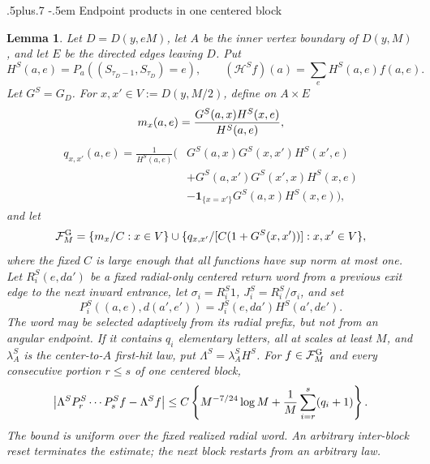 \documentclass[12pt,reqno]{amsart}
\makeatletter
\def\subsection{\@startsection{subsection}{2}{0pt}%
  {.5\linespacing plus.7\linespacing}
  {-.5em}
  {\normalfont\scshape}}
\theoremstyle{plain}
\newtheorem{lemma}[theorem]{Lemma}
\theoremstyle{definition}
\theoremstyle{remark}
\numberwithin{equation}{section}
\makeatother
\begin{document}
\subsection{Endpoint products in one centered block}
\begin{lemma}\label{lem:typed-centered-endpoint-product}
Let \(D=D(y,eM)\), let \(A\) be the inner vertex boundary of
\(D(y,M)\), and let \(E\) be the directed edges leaving \(D\).  Put
\[
 H^S(a,e)=P_a((S_{\tau_D-1},S_{\tau_D})=e),\qquad
 (\mathcal{H}^Sf)(a)=\sum_eH^S(a,e)f(a,e).
\]
Let \(G^S=G_D\).  For \(x,x'\in V:=D(y,M/2)\), define on
\(A\times E\)
\[
 m_x(a,e)={G^S(a,x)H^S(x,e)\over H^S(a,e)},
\]
\[
\begin{aligned}
q_{x,x'}(a,e)=\frac{1}{H^S(a,e)}\big(&G^S(a,x)G^S(x,x')H^S(x',e)\\
  &+G^S(a,x')G^S(x',x)H^S(x,e)\\
  &-\mathbf1_{\{x=x'\}}G^S(a,x)H^S(x,e)\big),
\end{aligned}
\]
and let
\begin{equation}
 \mathcal{F}_M^{\rm G}=\{m_x/C:x\in V\}\cup
 \{q_{x,x'}/[C(1+G^S(x,x'))]:x,x'\in V\},               \label{eq:tu-TP0}
\end{equation}
where the fixed \(C\) is large enough that all functions have sup norm
at most one.
Let \(R_i^S(e,da')\) be a fixed radial-only centered return word from a
previous exit edge to the next inward entrance, let
\(\sigma_i=R_i^S1\), \(J_i^S=R_i^S/\sigma_i\), and set
\begin{equation}
 P_i^S((a,e),d(a',e'))=J_i^S(e,da')H^S(a',de').           \label{eq:tu-TP1}
\end{equation}
The word may be selected adaptively from its radial prefix, but not from an
angular endpoint.  If it contains \(q_i\) elementary letters, all at scales
at least \(M\), and \(\lambda_A^S\) is the center-to-\(A\) first-hit law,
put \(\Lambda^S=\lambda_A^SH^S\).  For \(f\in\mathcal{F}_M^{\rm G}\) and
every consecutive portion \(r\le s\) of
one centered block,
\begin{equation}
 \left|\Lambda^SP_r^S\cdots P_s^Sf-\Lambda^Sf\right|
 \le C\left\{M^{-7/24}\log M+{1\over M}
                   \sum_{i=r}^s(q_i+1)\right\}.            \label{eq:tu-TP2}
\end{equation}
The bound is uniform over the fixed realized radial word.  An arbitrary
inter-block reset terminates the estimate; the next block restarts from an
arbitrary law.
\end{lemma}
\end{document}
